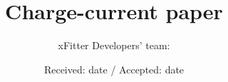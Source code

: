 \documentclass[pdftex,twocolumn,epjc3]{svjour3}          %
\begin{document}
\sloppy

\title{Charge-current paper}


\author{xFitter Developers' team:
}


\date{Received: date / Accepted: date}

\maketitle
\end{document}
